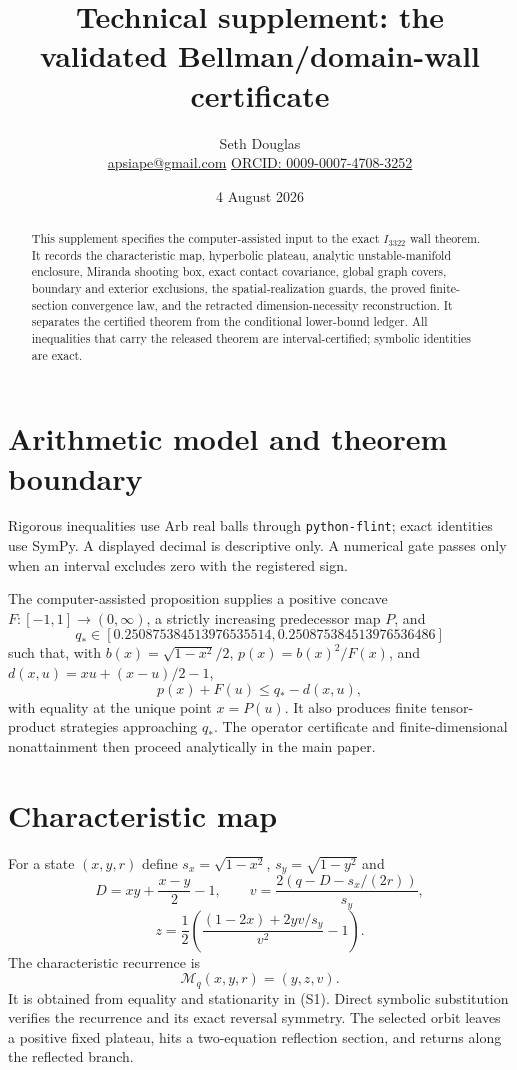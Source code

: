 \documentclass[11pt]{article}
\title{Technical supplement: the validated Bellman/domain-wall certificate}
\author{Seth Douglas\\
\small \href{mailto:apsiape@gmail.com}{apsiape@gmail.com}\quad
\href{https://orcid.org/0009-0007-4708-3252}{ORCID: 0009-0007-4708-3252}}
\date{4 August 2026}
\newcommand{\M}{\mathcal M}
\begin{document}
\maketitle

\begin{abstract}
This supplement specifies the computer-assisted input to the exact $I_{3322}$
wall theorem.  It records the characteristic map, hyperbolic plateau, analytic
unstable-manifold enclosure, Miranda shooting box, exact contact covariance,
global graph covers, boundary and exterior exclusions, the spatial-realization
guards, the proved finite-section convergence law, and the retracted
dimension-necessity reconstruction. It separates the certified theorem from
the conditional lower-bound ledger. All inequalities that carry the released
theorem are interval-certified; symbolic identities are exact.
\end{abstract}

\section{Arithmetic model and theorem boundary}

Rigorous inequalities use Arb real balls through \texttt{python-flint}; exact
identities use SymPy.  A displayed decimal is descriptive only.  A numerical
gate passes only when an interval excludes zero with the registered sign.

The computer-assisted proposition supplies a positive concave
$F:[-1,1]\to(0,\infty)$, a strictly increasing predecessor map $P$, and
\[
 q_*\in[0.250875384513976535514,
          0.250875384513976536486]
\]
such that, with $b(x)=\sqrt{1-x^2}/2$, $p(x)=b(x)^2/F(x)$, and
$d(x,u)=xu+(x-u)/2-1$,
\[
 p(x)+F(u)\le q_*-d(x,u),                       \tag{S1}
\]
with equality at the unique point $x=P(u)$.  It also produces finite
tensor-product strategies approaching $q_*$.  The operator certificate and
finite-dimensional nonattainment then proceed analytically in the main paper.

\section{Characteristic map}

For a state $(x,y,r)$ define $s_x=\sqrt{1-x^2}$,
$s_y=\sqrt{1-y^2}$ and
\[
 D=xy+\frac{x-y}{2}-1,
 \qquad
 v=\frac{2(q-D-s_x/(2r))}{s_y},
\]
\[
 z=\frac12\left(\frac{(1-2x)+2yv/s_y}{v^2}-1\right).
\]
The characteristic recurrence is
\[
 \M_q(x,y,r)=(y,z,v).                            \tag{S2}
\]
It is obtained from equality and stationarity in (S1).  Direct symbolic
substitution verifies the recurrence and its exact reversal symmetry.  The
selected orbit leaves a positive fixed plateau, hits a two-equation reflection
section, and returns along the reflected branch.
\end{document}
